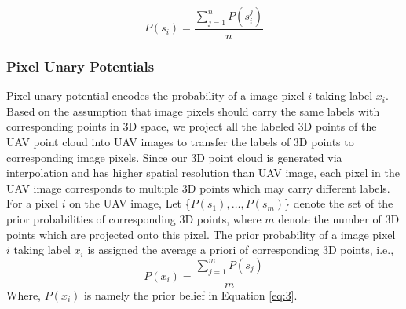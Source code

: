 \begin{equation}
\label{eq:6}
P\left(s_i\right)=\frac{\sum_{j=1}^{n}P\left(s_i^j\right)}{n}
\end{equation}

\subsubsection{Pixel Unary Potentials}Pixel unary potential encodes the probability of a image pixel $i$ taking label $x_i$. Based on the assumption that image pixels should carry the same labels with corresponding points in 3D space, we project all the labeled 3D points of the UAV point cloud into UAV images to transfer the labels of 3D points to corresponding image pixels. Since our 3D point cloud is generated via interpolation and has higher spatial resolution than UAV image, each pixel in the UAV image corresponds to multiple 3D points which may carry different labels. For a pixel $i$ on the UAV image, Let \big\{$P\left(s_1\right), \dots, P\left(s_m\right)$\big\} denote the set of the prior probabilities of corresponding 3D points, where $m$ denote the number of 3D points which are projected onto this pixel. The prior probability of a image pixel $i$ taking label $x_i$ is assigned the average a priori of corresponding 3D points, i.e., 
\begin{equation}
\label{eq:7}
P\left(x_i\right)=\frac{\sum_{j=1}^{m}P\left(s_j\right)}{m}
\end{equation}
Where, $P\left(x_i\right)$ is namely the prior belief in Equation \ref{eq:3}.


